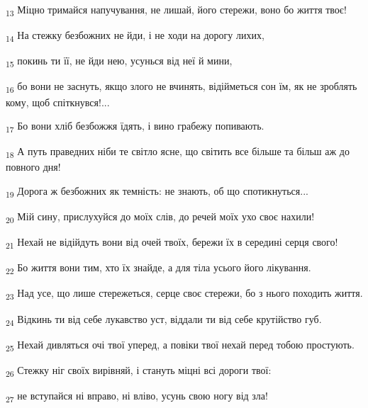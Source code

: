 \begin{tcolorbox}
\textsubscript{13} Міцно тримайся напучування, не лишай, його стережи, воно бо життя твоє!
\end{tcolorbox}
\begin{tcolorbox}
\textsubscript{14} На стежку безбожних не йди, і не ходи на дорогу лихих,
\end{tcolorbox}
\begin{tcolorbox}
\textsubscript{15} покинь ти її, не йди нею, усунься від неї й мини,
\end{tcolorbox}
\begin{tcolorbox}
\textsubscript{16} бо вони не заснуть, якщо злого не вчинять, відійметься сон їм, як не зроблять кому, щоб спіткнувся!...
\end{tcolorbox}
\begin{tcolorbox}
\textsubscript{17} Бо вони хліб безбожжя їдять, і вино грабежу попивають.
\end{tcolorbox}
\begin{tcolorbox}
\textsubscript{18} А путь праведних ніби те світло ясне, що світить все більше та більш аж до повного дня!
\end{tcolorbox}
\begin{tcolorbox}
\textsubscript{19} Дорога ж безбожних як темність: не знають, об що спотикнуться...
\end{tcolorbox}
\begin{tcolorbox}
\textsubscript{20} Мій сину, прислухуйся до моїх слів, до речей моїх ухо своє нахили!
\end{tcolorbox}
\begin{tcolorbox}
\textsubscript{21} Нехай не відійдуть вони від очей твоїх, бережи їх в середині серця свого!
\end{tcolorbox}
\begin{tcolorbox}
\textsubscript{22} Бо життя вони тим, хто їх знайде, а для тіла усього його лікування.
\end{tcolorbox}
\begin{tcolorbox}
\textsubscript{23} Над усе, що лише стережеться, серце своє стережи, бо з нього походить життя.
\end{tcolorbox}
\begin{tcolorbox}
\textsubscript{24} Відкинь ти від себе лукавство уст, віддали ти від себе крутійство губ.
\end{tcolorbox}
\begin{tcolorbox}
\textsubscript{25} Нехай дивляться очі твої уперед, а повіки твої нехай перед тобою простують.
\end{tcolorbox}
\begin{tcolorbox}
\textsubscript{26} Стежку ніг своїх вирівняй, і стануть міцні всі дороги твої:
\end{tcolorbox}
\begin{tcolorbox}
\textsubscript{27} не вступайся ні вправо, ні вліво, усунь свою ногу від зла!
\end{tcolorbox}
